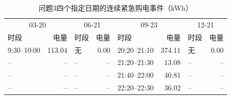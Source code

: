 \begin{table}[H]\centering\scriptsize
\caption{问题3四个指定日期的连续紧急购电事件（kWh）}\label{tab:q3_emergency}
\begin{tabular}{lrlrlrlr}\toprule
\multicolumn{2}{c}{03-20} & \multicolumn{2}{c}{06-21} & \multicolumn{2}{c}{09-23} & \multicolumn{2}{c}{12-21} \\
时段 & 电量 & 时段 & 电量 & 时段 & 电量 & 时段 & 电量 \\\midrule
9:30--10:00 & 113.04 & 无 & 0.00 & 20:20--21:10 & 374.11 & 无 & 0.00 \\
-- & -- & -- & -- & 21:20--21:30 & 13.08 & -- & -- \\
-- & -- & -- & -- & 21:40--22:00 & 40.81 & -- & -- \\
-- & -- & -- & -- & 22:20--22:30 & 36.02 & -- & -- \\
\bottomrule\end{tabular}\end{table}
